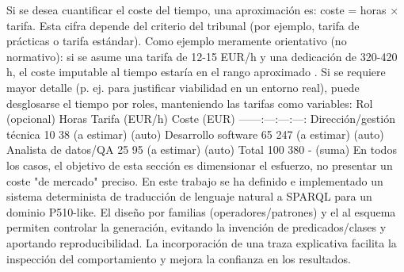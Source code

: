 {}Si se desea cuantificar el coste del tiempo, una aproximación es: coste = horas × tarifa. Esta cifra depende del criterio del tribunal (por ejemplo, tarifa de prácticas o tarifa estándar).\markdownRendererInterblockSeparator
{}Como ejemplo meramente orientativo (no normativo): si se asume una tarifa de 12-15 EUR/h y una dedicación de 320-420 h, el coste imputable al tiempo estaría en el rango aproximado .\markdownRendererInterblockSeparator
{}Si se requiere mayor detalle (p. ej. para justificar viabilidad en un entorno real), puede desglosarse el tiempo por roles, manteniendo las tarifas como variables:\markdownRendererInterblockSeparator
{}\markdownRendererPipe{} Rol \markdownRendererPipe{} \markdownRendererBackslash{}\markdownRendererPercentSign{} (opcional) \markdownRendererPipe{} Horas \markdownRendererPipe{} Tarifa (EUR/h) \markdownRendererPipe{} Coste (EUR) \markdownRendererPipe{} \markdownRendererPipe{}---\markdownRendererPipe{}---:\markdownRendererPipe{}---:\markdownRendererPipe{}---:\markdownRendererPipe{}---:\markdownRendererPipe{} \markdownRendererPipe{} Dirección/gestión técnica \markdownRendererPipe{} 10\markdownRendererBackslash{}\markdownRendererPercentSign{} \markdownRendererPipe{} 38 \markdownRendererPipe{} (a estimar) \markdownRendererPipe{} (auto) \markdownRendererPipe{} \markdownRendererPipe{} Desarrollo software \markdownRendererPipe{} 65\markdownRendererBackslash{}\markdownRendererPercentSign{} \markdownRendererPipe{} 247 \markdownRendererPipe{} (a estimar) \markdownRendererPipe{} (auto) \markdownRendererPipe{} \markdownRendererPipe{} Analista de datos/QA \markdownRendererPipe{} 25\markdownRendererBackslash{}\markdownRendererPercentSign{} \markdownRendererPipe{} 95 \markdownRendererPipe{} (a estimar) \markdownRendererPipe{} (auto) \markdownRendererPipe{} \markdownRendererPipe{} Total \markdownRendererPipe{} 100\markdownRendererBackslash{}\markdownRendererPercentSign{} \markdownRendererPipe{} 380 \markdownRendererPipe{} - \markdownRendererPipe{} (suma) \markdownRendererPipe{}\markdownRendererInterblockSeparator
{}En todos los casos, el objetivo de esta sección es dimensionar el esfuerzo, no presentar un coste "de mercado" preciso.\markdownRendererInterblockSeparator
{}\markdownRendererHorizontalRule{}\markdownRendererInterblockSeparator
{}\markdownRendererInterblockSeparator
{}\markdownRendererInterblockSeparator
{}En este trabajo se ha definido e implementado un sistema determinista de traducción de lenguaje natural a SPARQL para un dominio P510-like. El diseño por familias (operadores/patrones) y el  al esquema permiten controlar la generación, evitando la invención de predicados/clases y aportando reproducibilidad. La incorporación de una traza explicativa facilita la inspección del comportamiento y mejora la confianza en los resultados.\markdownRendererInterblockSeparator
